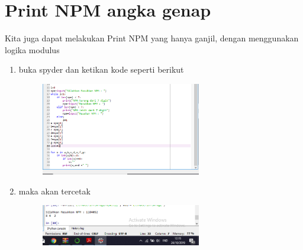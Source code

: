 \chapter*{Print NPM angka genap}
\par Kita juga dapat melakukan Print NPM yang hanya ganjil, dengan menggunakan logika modulus

\begin{enumerate}
   

\item buka spyder dan ketikan kode seperti berikut
	\begin{figure} [h]
	\includegraphics[width=7cm]{npm/npm5.png}
	\centering
	\end{figure}
	
	
	
 \item maka akan tercetak 
 \begin{figure} [h]
	\includegraphics[width=7cm]{npm/npm6.png}
	\centering
	\end{figure}
 
	
	\end{enumerate}